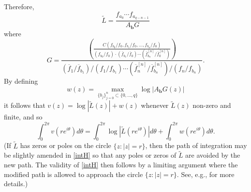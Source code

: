 \documentclass{amsart}
\theoremstyle{definition}
\numberwithin{equation}{section}
\numberwithin{theorem}{section}
\begin{document}
Therefore,
    \begin{equation*}
    \widetilde L=\frac{f_{a_0}\cdots f_{a_{q-n-1}}}{A_\textbf{b} G}
    \end{equation*}
where
    \begin{equation}\label{G}
    G=\frac{
    {\displaystyle \left( \frac{ C(f_{b_0}/f_0,f_{b_1}/f_0,\ldots,f_{b_n}/f_0)}{(f_{b_0}/f_0)\cdot
    (\overline{f}_{b_1}/\overline{f}_{0})\cdots (\overline{f}_{b_n}^{[n]}/\overline{f}_{0}^{[n]})}\right)}}{(\overline{f}_1/\overline{f}_{b_1})/(f_1/f_{b_1})\cdots
    (\overline{f}_n^{[n]}/\overline{f}_{b_n}^{[n]})/(f_n/f_{b_n})}.
    \end{equation}
By defining
    \begin{equation*}
    w(z)=\max_{\{b_j\}_{j=0}^n\subset\{0,\ldots,q\}}\log|A_\textbf{b} G(z)|
    \end{equation*}
it follows that $v(z)=\log|\widetilde L(z)|+w(z)$ whenever $\widetilde L(z)$ non-zero
and finite, and so
    \begin{equation}\label{intH}
    \int_0^{2\pi} v(re^{i\theta})d\theta =  \int_0^{2\pi}
    \log|\widetilde L(re^{i\theta})|d\theta +     \int_0^{2\pi} w(re^{i\theta})d\theta.
    \end{equation}
(If $\widetilde L$ has zeros or poles on the circle $\{z:|z|=r\}$, then the path of integration may be slightly
amended in \eqref{intH} so that any poles or zeros of $\widetilde L$ are avoided by the new
path. The validity of \eqref{intH} then follows by a limiting
argument where the modified path is allowed to approach the circle
$\{z:|z|=r\}$. See, e.g., \cite{gundersenh:04} for more details.)
\end{document}
